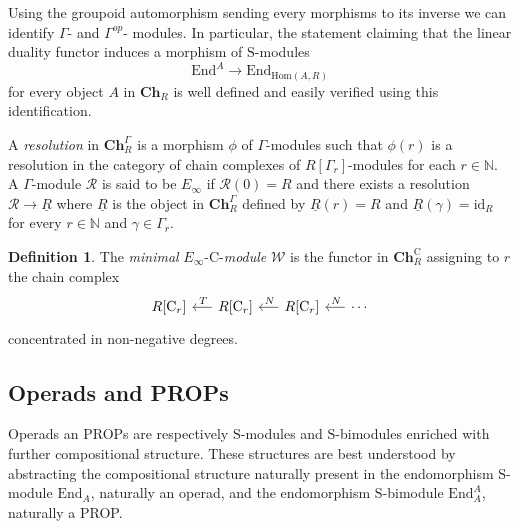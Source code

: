 \documentclass[A4]{amsart}
\theoremstyle{definition}
\newtheorem{definition}[theorem]{Definition}
\newcommand{\Hom}{\mathrm{Hom}}
\newcommand{\End}{\mathrm{End}}
\begin{document}
Using the groupoid automorphism sending every morphisms to its inverse we can identify $\Gamma$- and $\Gamma^{op}$- modules. In particular, the statement claiming that the linear duality functor induces a morphism of $\mathrm{S}$-modules
\begin{equation*}
\End^A \to \End_{\Hom(A, R)}
\end{equation*}
for every object $A$ in $\mathbf{Ch}_R$ is well defined and easily verified using this identification.

A \textit{resolution} in $\mathbf{Ch}_R^\Gamma$ is a morphism $\phi$ of $\Gamma$-modules such that $\phi(r)$ is a resolution in the category of chain complexes of $R[\Gamma_r]$-modules for each $r \in \mathbb{N}$. A $\Gamma$-module $\mathcal R$ is said to be $E_\infty$ if $\mathcal R(0) = R$ and there exists a resolution $\mathcal R \to \underline{R}$ where $\underline{R}$ is the object in $\mathbf{Ch}_R^\Gamma$ defined by $\underline{R}(r) = R$ and $\underline{R}(\gamma) = \mathrm{id}_R$ for every $r \in \mathbb{N}$ and $\gamma \in \Gamma_r$.

\begin{definition} \label{def: minimal cyclic resolution}
	The \textit{minimal} $E_\infty$-$\mathrm{C}$-\textit{module} $\mathcal W$ is the functor in $\mathbf{Ch}_R^\mathrm{C}$ assigning to $r$ the chain complex
	\begin{equation*}
	\begin{tikzcd} [column sep = .5cm]
	R[\mathrm{C}_r] & \arrow[l, "\,T"'] R[\mathrm{C}_r] & \arrow[l, "\,N"'] R[\mathrm{C}_r] & \arrow[l, "\,N"'] \cdots
	\end{tikzcd}
	\end{equation*}
	concentrated in non-negative degrees.
\end{definition}

\subsection{Operads and PROPs}

Operads an PROPs are respectively $\mathrm{S}$-modules and \mbox{$\mathrm{S}$-bimodules} enriched with further compositional structure. These structures are best understood by abstracting the compositional structure naturally present in the endomorphism $\mathrm{S}$-module $\End_A$, naturally an operad, and the endomorphism $\mathrm{S}$-bimodule $\End_A^A$, naturally a PROP.
\end{document}

